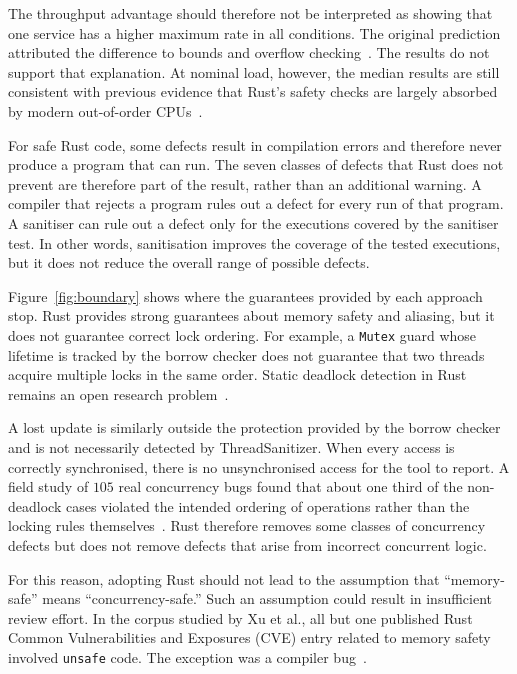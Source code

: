 \documentclass[english,oneside,a4paper,censored,csm,software-track-2020]{HYthesisML}
\begin{document}
The throughput advantage should therefore not be interpreted as showing that
one service has a higher maximum rate in all conditions. The original prediction
attributed the difference to bounds and overflow
checking~\cite{zhang2022runtime,harris2023morello}. The results do not support
that explanation. At nominal load, however, the median results are still
consistent with previous evidence that Rust's safety checks are largely absorbed
by modern out-of-order CPUs~\cite{balasubramanian2017rust,emmerich2019drivers}.

For safe Rust code, some defects result in compilation errors and therefore
never produce a program that can run. The seven classes of defects that Rust
does not prevent are therefore part of the result, rather than an additional
warning. A compiler that rejects a program rules out a defect for every run of
that program. A sanitiser can rule out a defect only for the executions
covered by the sanitiser test. In other words, sanitisation improves the
coverage of the tested executions, but it does not reduce the overall range
of possible defects.

Figure~\ref{fig:boundary} shows where the guarantees provided by each
approach stop. Rust provides strong guarantees about memory safety and
aliasing, but it does not guarantee correct lock ordering. For example, a
\texttt{Mutex} guard whose lifetime is tracked by the borrow checker does not
guarantee that two threads acquire multiple locks in the same order. Static
deadlock detection in Rust remains an open research
problem~\cite{zhang2026deadlock}.

A lost update is similarly outside the protection provided by the borrow
checker and is not necessarily detected by ThreadSanitizer. When every access
is correctly synchronised, there is no unsynchronised access for the tool to
report. A field study of $105$ real concurrency bugs found that about one third
of the non-deadlock cases violated the intended ordering of operations rather
than the locking rules themselves~\cite{lu2008mistakes}. Rust therefore removes
some classes of concurrency defects but does not remove defects that arise from
incorrect concurrent logic.

For this reason, adopting Rust should not lead to the assumption that
``memory-safe'' means ``concurrency-safe.'' Such an assumption could result
in insufficient review effort. In the corpus studied by Xu et al., all but one
published Rust Common Vulnerabilities and Exposures (CVE) entry related to
memory safety involved \texttt{unsafe} code. The exception was a compiler
bug~\cite{xu2021rustcve}.
\end{document}
